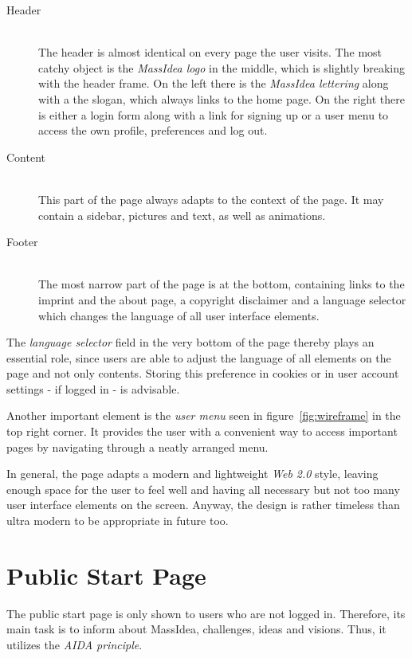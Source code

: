 \documentclass[a4paper, notitlepage, oneside]{article}
\begin{document}
\begin{description}
	\item[Header] \hfill \\
	The header is almost identical on every page the user visits. The most catchy object is the \emph{MassIdea logo} in the middle, which is slightly breaking with the header frame. On the left there is the \emph{MassIdea lettering} along with a the slogan, which always links to the home page. On the right there is either a login form along with a link for signing up or a user menu to access the own profile, preferences and log out. 
	\item[Content] \hfill \\
	This part of the page always adapts to the context of the page. It may contain a sidebar, pictures and text, as well as animations.
	\item[Footer] \hfill \\
	The most narrow part of the page is at the bottom, containing links to the imprint and the about page, a copyright disclaimer and a language selector which changes the language of all user interface elements.
\end{description}

The \emph{language selector} field in the very bottom of the page thereby plays an essential role, since users are able to adjust the language of all elements on the page and not only contents. Storing this preference in cookies or in user account settings - if logged in - is  advisable.

Another important element is the \emph{user menu} seen in figure~\ref{fig:wireframe} in the top right corner. It provides the user with a convenient way to access important pages by navigating through a neatly arranged menu.

In general, the page adapts a modern and lightweight \emph{Web 2.0} style, leaving enough space for the user to feel well and having all necessary but not too many user interface elements on the screen. Anyway, the design is rather timeless than ultra modern to be appropriate in future too.

\section{Public Start Page}
\label{sec:public}

The public start page is only shown to users who are not logged in. Therefore, its main task is to inform about MassIdea, challenges, ideas and visions. Thus, it utilizes the \emph{AIDA principle}.
\end{document}
